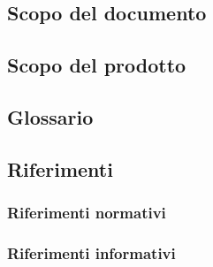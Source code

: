 \subsection{Scopo del documento}

\subsection{Scopo del prodotto}

\subsection{Glossario}

\subsection{Riferimenti}
\subsubsection{Riferimenti normativi}

\subsubsection{Riferimenti informativi}
